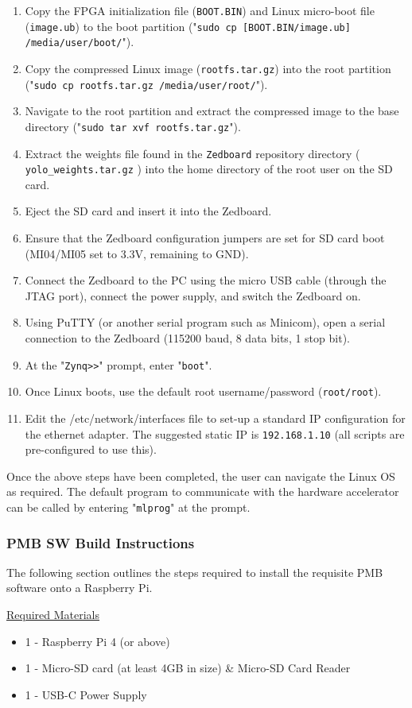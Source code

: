 \documentclass[10pt,letterpaper]{article}
\begin{document}
\begin{enumerate}
\item Copy the FPGA initialization file (\texttt{BOOT.BIN}) and Linux micro-boot file (\texttt{image.ub}) to the boot partition ("\texttt{sudo cp [BOOT.BIN/image.ub] /media/user/boot/}").
\item Copy the compressed Linux image (\texttt{rootfs.tar.gz}) into the root partition ("\texttt{sudo cp rootfs.tar.gz /media/user/root/}"). 
\item Navigate to the root partition and extract the compressed image to the base directory ("\texttt{sudo tar xvf rootfs.tar.gz}").
\item Extract the weights file found in the \texttt{Zedboard\/} repository directory ( \texttt{yolo\_weights.tar.gz} ) into the home directory of the root user on the SD card.
\item Eject the SD card and insert it into the Zedboard.
\item Ensure that the Zedboard configuration jumpers are set for SD card boot (MI04/MI05 set to 3.3V, remaining to GND).
\item Connect the Zedboard to the PC using the micro USB cable (through the JTAG port), connect the power supply, and switch the Zedboard on.
\item Using PuTTY (or another serial program such as Minicom), open a serial connection to the Zedboard (115200 baud, 8 data bits, 1 stop bit).
\item At the "\texttt{Zynq>>}" prompt, enter "\texttt{boot}".
\item Once Linux boots, use the default root username/password (\texttt{root/root}).
\item Edit the /etc/network/interfaces file to set-up a standard IP configuration for the ethernet adapter. The suggested static IP is \texttt{192.168.1.10} (all scripts are pre-configured to use this).
\end{enumerate}

Once the above steps have been completed, the user can navigate the Linux OS as required. The default program to communicate with the hardware accelerator can be called by entering "\texttt{mlprog}" at the prompt.

\subsubsection{PMB SW Build Instructions}
The following section outlines the steps required to install the requisite PMB software onto a Raspberry Pi.

\underline{Required Materials}
\begin{itemize}
\item 1 - Raspberry Pi 4 (or above)
\item 1 - Micro-SD card (at least 4GB in size) \& Micro-SD Card Reader
\item 1 - USB-C Power Supply
\end{itemize}
\end{document}
